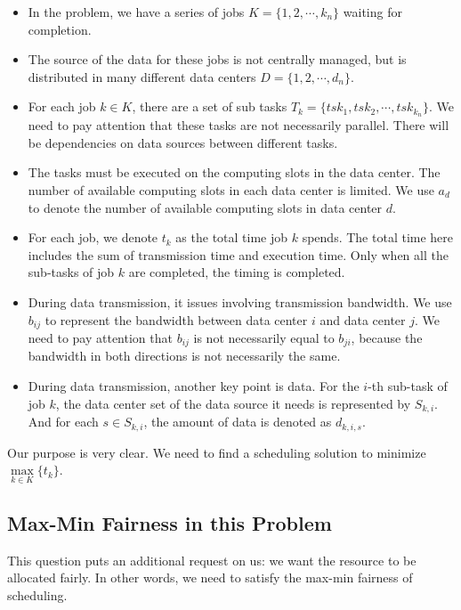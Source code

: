 \documentclass{llncs}
\begin{document}
\begin{itemize}
    \item In the problem, we have a series of jobs $ K = \{1, 2, \cdots, k_n\} $ waiting for completion. 
    
    \item The source of the data for these jobs is not centrally managed, but is distributed in many different data centers $ D = \{1, 2, \cdots, d_n\} $. 
    
    \item For each job $ k \in K $, there are a set of sub tasks $ T_k = \{tsk_1, tsk_2, \cdots, tsk_{k_n}\} $. We need to pay attention that these tasks are not necessarily parallel. There will be dependencies on data sources between different tasks.  
    
    \item The tasks must be executed on the computing slots in the data center. The number of available computing slots in each data center is limited. We use $ a_d $ to denote the number of available computing slots in data center $ d $. 
    \item For each job, we denote $ t_k $ as the total time job $ k $ spends. The total time here includes the sum of transmission time and execution time. Only when all the sub-tasks of job $ k $ are completed, the timing is completed.
    \item During data transmission, it issues involving transmission bandwidth. We use $ b_{ij} $ to represent the bandwidth between data center $ i $ and data center $ j $. We need to pay attention that $ b_{ij} $ is not necessarily equal to $ b_{ji} $, because the bandwidth in both directions is not necessarily the same.
    \item During data transmission, another key point is data. For the $ i $-th sub-task of job $ k $, the data center set of the data source it needs is represented by $ S_{k,i} $. And for each $ s \in S_{k,i} $, the amount of data is denoted as $ d_{k,i,s} $.
\end{itemize}

Our purpose is very clear. We need to find a scheduling solution to minimize $ \mathop{max}\limits_{k \in K} \{ t_k \} $. 

\subsection{Max-Min Fairness in this Problem}

This question puts an additional request on us: we want the resource to be allocated fairly. In other words, we need to satisfy the max-min fairness of scheduling.
\end{document}
